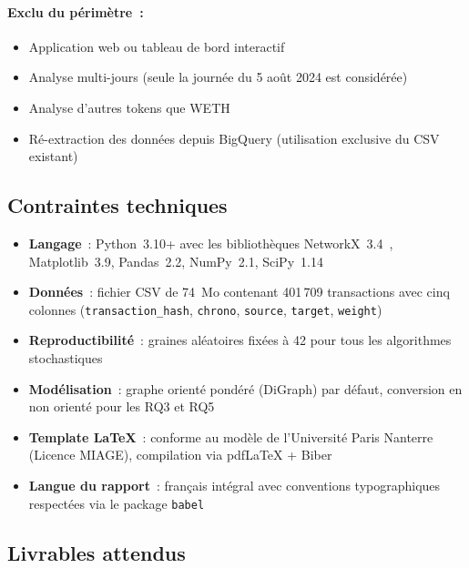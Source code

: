 \paragraph{Exclu du p\'erim\`etre~:}
\begin{itemize}
  \item Application web ou tableau de bord interactif
  \item Analyse multi-jours (seule la journ\'ee du 5 ao\^ut 2024 est consid\'er\'ee)
  \item Analyse d'autres tokens que WETH
  \item R\'e-extraction des donn\'ees depuis BigQuery (utilisation exclusive du CSV existant)
\end{itemize}


\subsection{Contraintes techniques}

\begin{itemize}
  \item \textbf{Langage}~: Python~3.10+ avec les biblioth\`eques NetworkX~3.4~\cite{networkx_docs}, Matplotlib~3.9, Pandas~2.2, NumPy~2.1, SciPy~1.14
  \item \textbf{Donn\'ees}~: fichier CSV de 74~Mo contenant 401\,709 transactions avec cinq colonnes (\texttt{transaction\_hash}, \texttt{chrono}, \texttt{source}, \texttt{target}, \texttt{weight})
  \item \textbf{Reproductibilit\'e}~: graines al\'eatoires fix\'ees \`a 42 pour tous les algorithmes stochastiques
  \item \textbf{Mod\'elisation}~: graphe orient\'e pond\'er\'e (DiGraph) par d\'efaut, conversion en non orient\'e pour les RQ3 et RQ5
  \item \textbf{Template LaTeX}~: conforme au mod\`ele de l'Universit\'e Paris Nanterre (Licence MIAGE), compilation via pdfLaTeX + Biber
  \item \textbf{Langue du rapport}~: fran\c{c}ais int\'egral avec conventions typographiques respect\'ees via le package \texttt{babel}
\end{itemize}


\subsection{Livrables attendus}

